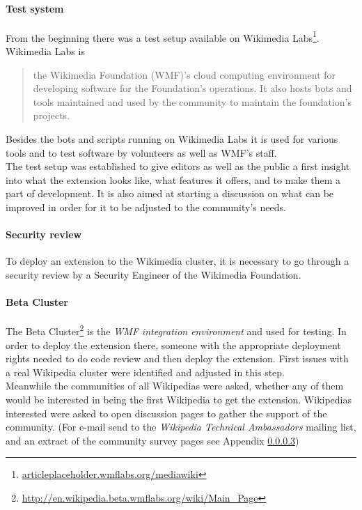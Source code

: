 \paragraph{Test system}
From the beginning there was a test setup available on Wikimedia Labs\footnote{\url{articleplaceholder.wmflabs.org/mediawiki}}. Wikimedia Labs is 
\begin{quotation}
	the Wikimedia Foundation (WMF)'s cloud computing environment for developing software for the Foundation's operations. It also hosts bots and tools maintained and used by the community to maintain the foundation's projects. 
\end{quotation} \citep{wiki:03}
Besides the bots and scripts running on Wikimedia Labs it is used for various tools and to test software by volunteers as well as WMF's staff. \\
The test setup was established to give editors as well as the public a first insight into what the extension looks like, what features it offers, and to make them a part of development. It is also aimed at starting a discussion on what can be improved in order for it to be adjusted to the community's needs.

\paragraph{Security review}
To deploy an extension to the Wikimedia cluster, it is necessary to go through a security review by a Security Engineer of the Wikimedia Foundation. 
  
\paragraph{Beta Cluster}
The Beta Cluster\footnote{\url{http://en.wikipedia.beta.wmflabs.org/wiki/Main_Page}} is the \textit{WMF integration environment} and used for testing. In order to deploy the extension there, someone with the appropriate deployment rights needed to do code review and then deploy the extension. First issues with a real Wikipedia cluster were identified and adjusted in this step. \\
Meanwhile the communities of all Wikipedias were asked, whether any of them would be interested in being the first Wikipedia to get the extension. Wikipedias interested were asked to open discussion pages to gather the support of the community. (For e-mail send to the \textit{Wikipedia Technical Ambassadors} mailing list, and an extract of the community survey pages see Appendix \ref{})

